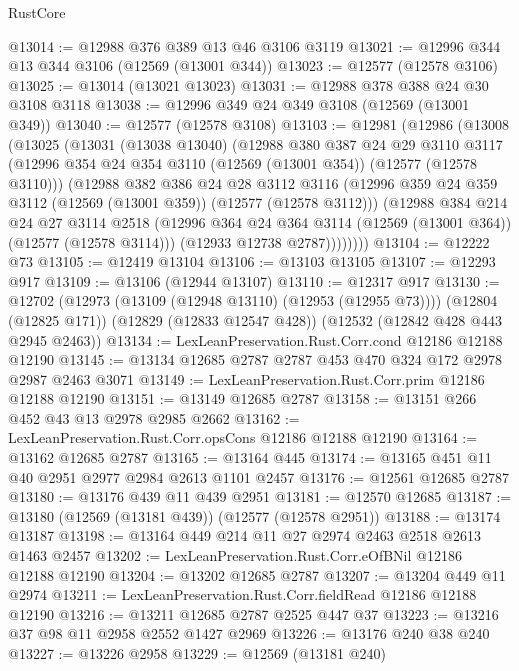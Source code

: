\begin{lexlean}{RustCore}
\begin{coremodule}
@13014 := @12988 @376 @389 @13 @46 @3106 @3119
@13021 := @12996 @344 @13 @344 @3106 (@12569 (@13001 @344))
@13023 := @12577 (@12578 @3106)
@13025 := @13014 (@13021 @13023)
@13031 := @12988 @378 @388 @24 @30 @3108 @3118
@13038 := @12996 @349 @24 @349 @3108 (@12569 (@13001 @349))
@13040 := @12577 (@12578 @3108)
@13103 := @12981
    (@12986
      (@13008
        (@13025
          (@13031
            (@13038 @13040)
            (@12988
              @380
              @387
              @24
              @29
              @3110
              @3117
              (@12996 @354 @24 @354 @3110 (@12569 (@13001 @354)) (@12577 (@12578 @3110)))
              (@12988
                @382
                @386
                @24
                @28
                @3112
                @3116
                (@12996 @359 @24 @359 @3112 (@12569 (@13001 @359)) (@12577 (@12578 @3112)))
                (@12988
                  @384
                  @214
                  @24
                  @27
                  @3114
                  @2518
                  (@12996 @364 @24 @364 @3114 (@12569 (@13001 @364)) (@12577 (@12578 @3114)))
                  (@12933 @12738 @2787))))))))
@13104 := @12222 @73
@13105 := @12419 @13104
@13106 := @13103 @13105
@13107 := @12293 @917
@13109 := @13106 (@12944 @13107)
@13110 := @12317 @917
@13130 := @12702
    (@12973 (@13109 (@12948 @13110) (@12953 (@12955 @73))))
    (@12804 (@12825 @171))
    (@12829 (@12833 @12547 @428))
    (@12532 (@12842 @428 @443 @2945 @2463))
@13134 := LexLeanPreservation.Rust.Corr.cond @12186 @12188 @12190
@13145 := @13134 @12685 @2787 @2787 @453 @470 @324 @172 @2978 @2987 @2463 @3071
@13149 := LexLeanPreservation.Rust.Corr.prim @12186 @12188 @12190
@13151 := @13149 @12685 @2787
@13158 := @13151 @266 @452 @43 @13 @2978 @2985 @2662
@13162 := LexLeanPreservation.Rust.Corr.opsCons @12186 @12188 @12190
@13164 := @13162 @12685 @2787
@13165 := @13164 @445
@13174 := @13165 @451 @11 @40 @2951 @2977 @2984 @2613 @1101 @2457
@13176 := @12561 @12685 @2787
@13180 := @13176 @439 @11 @439 @2951
@13181 := @12570 @12685
@13187 := @13180 (@12569 (@13181 @439)) (@12577 (@12578 @2951))
@13188 := @13174 @13187
@13198 := @13164 @449 @214 @11 @27 @2974 @2463 @2518 @2613 @1463 @2457
@13202 := LexLeanPreservation.Rust.Corr.eOfBNil @12186 @12188 @12190
@13204 := @13202 @12685 @2787
@13207 := @13204 @449 @11 @2974
@13211 := LexLeanPreservation.Rust.Corr.fieldRead @12186 @12188 @12190
@13216 := @13211 @12685 @2787 @2525 @447 @37
@13223 := @13216 @37 @98 @11 @2958 @2552 @1427 @2969
@13226 := @13176 @240 @38 @240
@13227 := @13226 @2958
@13229 := @12569 (@13181 @240)

\end{coremodule}
\end{lexlean}
